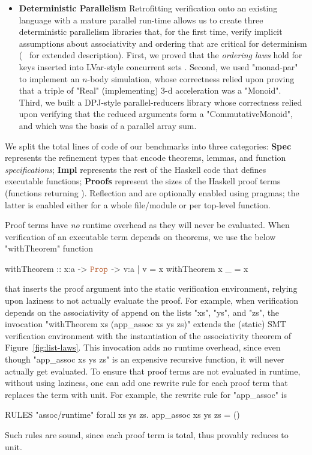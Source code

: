 \begin{itemize}[leftmargin=*]
\item\textbf{Deterministic Parallelism}
%
Retrofitting verification
onto an existing language with a mature parallel run-time
allows us to create three deterministic
parallelism libraries that, for the first time,
verify implicit assumptions about associativity
and ordering that are critical for determinism 
(\cf~\cite{appendix} for extended description).
%
First, we proved that the \emph{ordering laws} hold for keys
inserted into LVar-style concurrent sets \cite{kuper2014freeze}.
%
Second, we used "monad-par" \cite{monad-par} to implement an $n$-body
simulation, whose correctness relied upon proving that a triple of "Real"
(implementing) 3-d acceleration was a "Monoid".
%
Third, we built a DPJ-style \cite{DPJ} parallel-reducers library
whose correctness relied upon verifying that the reduced
arguments form a "CommutativeMonoid", and which was the basis of
a parallel array sum.
\end{itemize}

%
We split the total lines of code of our benchmarks
into three categories:
%
\textbf{Spec} represents the refinement types that
encode theorems, lemmas, and function \emph{specifications};
%
\textbf{Impl} represents the rest of the Haskell
code that defines executable functions;
%
\textbf{Proofs} represent the sizes of the Haskell proof terms
(\ie functions returning \typp).
%
Reflection and \pbesym are optionally
enabled using pragmas; the latter is enabled
either for a whole file/module or per
top-level function.

%
Proof terms have \emph{no} runtime overhead
as they will never be evaluated.
%
When verification of an executable term
depends on theorems, we use the below 
"withTheorem" function
%
\begin{mcode}
    withTheorem :: x:a -> $\typp$ -> { v:a | v = x }
    withTheorem x _ = x  
\end{mcode}
%
that inserts the proof argument into the static 
verification environment, relying upon laziness
to not actually evaluate the proof.
%
For example, when verification depends on the associativity 
of append on the lists "xs", "ys", and "zs", 
the invocation "withTheorem xs (app_assoc xs ys zs)"
extends the (static) SMT verification environment
with the instantiation of the associativity theorem of 
Figure~\ref{fig:list-laws}. 
%
This invocation adds no runtime overhead, since 
even though "app_assoc xs ys zs" is an expensive 
recursive function, it will never actually get evaluated. 
%
To ensure that proof terms are not evaluated in runtime, 
without using laziness, one can add one rewrite rule for 
each proof term that replaces the term with unit.
%
For example, the rewrite rule for "app_assoc" is 
%
\begin{code}
    RULES "assoc/runtime"  forall xs ys zs. app_assoc xs ys zs = () 
\end{code}
%
Such rules are sound, since each proof term is total, 
thus provably reduces to unit.

